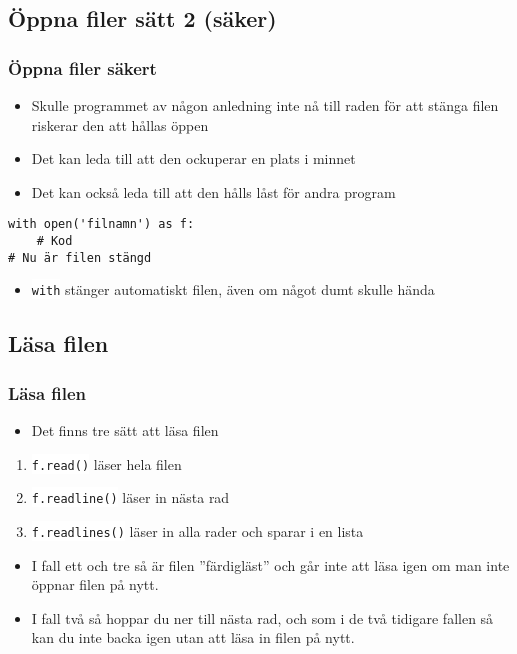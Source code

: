 \documentclass[aspectratio=169]{beamer}
\newcommand{\code}[1]{\colorbox{white}{\lstinline{#1}}}
\begin{document}
\subsection{Öppna filer sätt 2 (säker)}

\begin{frame}[fragile]
	\frametitle{Öppna filer säkert}
	
	\begin{itemize}
		\item Skulle programmet av någon anledning inte nå till raden för att stänga filen riskerar den att hållas öppen
		\item Det kan leda till att den ockuperar en plats i minnet
		\item Det kan också leda till att den hålls låst för andra program
	\end{itemize}
	
	\begin{lstlisting}
with open('filnamn') as f:
    # Kod
# Nu är filen stängd
	\end{lstlisting}
	
	\begin{itemize}
		\item \code{with} stänger automatiskt filen, även om något dumt skulle hända
	\end{itemize}
	
\end{frame}

\subsection{Läsa filen}

\begin{frame}[fragile]
	\frametitle{Läsa filen}
	
	\begin{itemize}
		\item Det finns tre sätt att läsa filen
	\end{itemize}
	
	\begin{enumerate}
		\item \code{f.read()} läser hela filen
		\item \code{f.readline()} läser in nästa rad
		\item \code{f.readlines()} läser in alla rader och sparar i en lista
	\end{enumerate}
	
	\begin{itemize}
		\item I fall ett och tre så är filen ''färdigläst'' och går inte att läsa igen om man inte öppnar filen på nytt.
		\item I fall två så hoppar du ner till nästa rad, och som i de två tidigare fallen så kan du inte backa igen utan att läsa in filen på nytt.
	\end{itemize}	
	
\end{frame}
\end{document}
